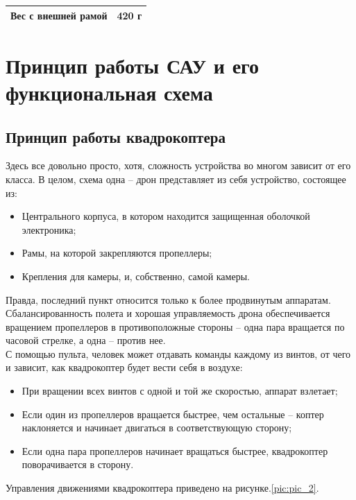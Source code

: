 \begin{table}[H]
\begin{center}
\begin{tabular}{|c|c|}
Вес с внешней рамой                                                                     & 420 г                                                                                                                                                                                                               \\ \hline
\end{tabular}
\end{center}
\end{table}

\section{Принцип работы САУ и его функциональная схема}
\subsection{Принцип работы квадрокоптера}
Здесь все довольно просто, хотя, сложность устройства во многом зависит от его класса. В целом, схема одна – дрон представляет из себя устройство, состоящее из:\cite{kvadr}
\begin{itemize}
\item Центрального корпуса, в котором находится защищенная оболочкой электроника;
\item Рамы, на которой закрепляются пропеллеры;
\item Крепления для камеры, и, собственно, самой камеры.
\end{itemize}
Правда, последний пункт относится только к более продвинутым аппаратам.\\
Сбалансированность полета и хорошая управляемость дрона обеспечивается вращением пропеллеров в противоположные стороны – одна пара вращается по часовой стрелке, а одна – против нее.\\
С помощью пульта, человек может отдавать команды каждому из винтов, от чего и зависит, как квадрокоптер будет вести себя в воздухе:
\begin{itemize}
\item При вращении всех винтов с одной и той же скоростью, аппарат взлетает\cite{thes};
\item Если один из пропеллеров вращается быстрее, чем остальные – коптер наклоняется и начинает двигаться в соответствующую сторону;
\item Если одна пара пропеллеров начинает вращаться быстрее, квадрокоптер поворачивается в сторону.
\end{itemize}
Управления движениями квадрокоптера приведено на рисунке.\ref{pic:pic_2}.\cite{Parrot}
